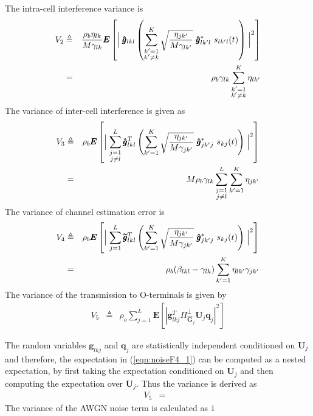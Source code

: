 \documentclass[10pt, a4paper, twoside,fleqn]{article}
\begin{document}
The intra-cell interference variance is
\begin{eqnarray}\label{eq:noiseF2}
	V_2 &\triangleq& \frac{\rho_b\eta_{lk}}{M\gamma_{lk}} \pmb{E}\left[\Bigm| \pmb{\hat g}_{lkl}  \left(\sum_{\substack{k'=1 \\ k' \neq k}}^{K} \sqrt{\frac{\eta_{jk'}}{M\gamma_{lk'}}} \ \pmb{\hat g}^*_{lk'l} \ s_{lk'l} (t)\right)\Bigm|^2\right] \nonumber \\
	    &=&  \rho_b\gamma_{lk}\sum\limits_{\substack{k'=1\\ k'\neq k}}^{K}\eta_{lk'}
\end{eqnarray}
The variance of inter-cell interference is given as
\begin{eqnarray}\label{eq:noiseF3}
	V_3 &\triangleq& \rho_b \pmb{E}\left[\Bigm|\sum_{\substack{j=1 \\ j \neq l}}^{L} \pmb{\hat g}_{lkl}^T \left(\sum_{k'=1}^{K} \sqrt{\frac{\eta_{jk'}}{M\gamma_{jk'}}} \ \pmb{\hat g}^*_{jk'j} \ s_{kj} (t)\right)\Bigm|^2\right] \nonumber \\
       &=& M\rho_b\gamma_{lk}\sum_{\substack{j=1 \\ j \neq l}}^{L}\sum_{k'=1}^{K}\eta_{jk'}
\end{eqnarray}
The variance of channel estimation error is
\begin{eqnarray}\label{eqn:noiseF4}
	V_4 &\triangleq& \rho_b \pmb{E} \left[ \Bigm |\sum_{j=1}^{L} \pmb{\widetilde{g}}_{lkl}^T \left(\sum_{k'=1}^{K} \sqrt{\frac{\eta_{jk'}}{M\gamma_{jk'}}} \ \pmb{\hat g}^*_{jk'j} \ s_{kj} (t)\right)\Bigm|^2 \right] \nonumber \\
        &=& \rho_b(\beta_{lkl}-\gamma_{lk})\sum\limits_{k'=1}^{K}\eta_{lk'}\gamma_{jk'}
\end{eqnarray}
The variance of the transmission to O-terminals is given by
\begin{eqnarray}\label{eqn:noiseF4_1}
	V_5 &\triangleq& \rho_o\sum_{j=1}^{L}\pmb{E}\left[|\pmb{g}_{lkj}^T\Pi^{\perp}_{{\widehat{\pmb{G}}_j}}\pmb{U}_j \pmb{q}_{j}|^2\right]
\end{eqnarray}

The random variables $\pmb{g}_{lkj}$ and $\pmb{q}_j$ are statistically independent conditioned on $\pmb{U}_j$ and therefore, the expectation in (\ref{eqn:noiseF4_1}) can be computed as a nested expectation, by first taking the expectation conditioned on $\pmb{U}_j$ and then computing the expectation over $\pmb{U}_j$. Thus the variance is derived as
\begin{eqnarray}\label{eqn:noiseF4}
	V_5 &=& 
\end{eqnarray}
The variance of the AWGN noise term is calculated as $1$
\end{document}
